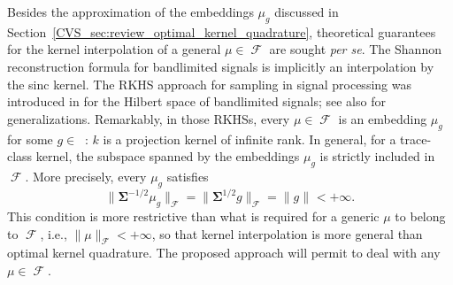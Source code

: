 \documentclass[twoside,11pt]{book}
\numberwithin{theorem}{chapter}
\numberwithin{definition}{chapter}
\numberwithin{proposition}{chapter}
\numberwithin{corollary}{chapter}
\numberwithin{example}{chapter}
\numberwithin{lemma}{chapter}
\DeclareMathOperator{\F}{\mathcal{F}}
\DeclareMathOperator{\Ltwo}{\mathbb{L}_{2}(\mathrm{d} \omega)}
\newcommand{\pc}[1]{\textcolor{blue}{#1}}
\begin{document}
Besides the approximation of the embeddings $\mu_{g}$ discussed in Section~\ref{CVS_sec:review_optimal_kernel_quadrature}, theoretical guarantees for the kernel interpolation of a general $\mu\in\F$ are sought \emph{per se}. The Shannon reconstruction formula for bandlimited signals \citep{Sha48} is implicitly an interpolation by the sinc kernel.
The RKHS approach for sampling in signal processing was introduced in \citep{Yao67} for the Hilbert space of bandlimited signals;
see also \citep{NaWa91} for generalizations.
Remarkably, in those RKHSs, every $\mu \in \F$ is an embedding $\mu_{g}$ for some $g \in \Ltwo$: $k$ is a projection kernel of infinite rank. In general, for a trace-class kernel, the subspace spanned by the embeddings $\mu_{g}$ is strictly included in $\F$. More precisely, every $\mu_{g}$ satisfies
\begin{equation}
\|\bm{\Sigma}^{-1/2} \mu_{g}\|_{\F} = \|\bm{\Sigma}^{1/2} g\|_{\F} = \|g\|_{\Ltwo} < +\infty. \nonumber
\end{equation}
This condition is more restrictive than what is required for a generic $\mu$ to belong to $\F$, i.e., $\|\mu\|_{\F}< +\infty$, so that kernel interpolation is more general than optimal kernel quadrature. The proposed approach will permit to deal with any $\mu\in\F$.








%
\end{document}
